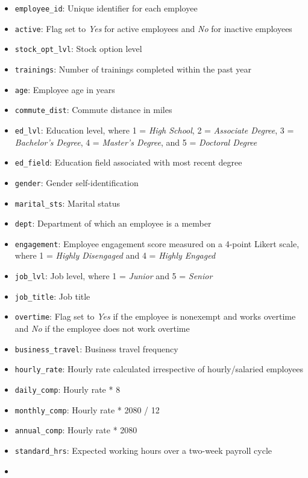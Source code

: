 \documentclass[]{book}
\providecommand{\tightlist}{%
  \setlength{\itemsep}{0pt}\setlength{\parskip}{0pt}}
\begin{document}
\begin{itemize}
\tightlist
\item
  \texttt{employee\_id}: Unique identifier for each employee
\item
  \texttt{active}: Flag set to \emph{Yes} for active employees and \emph{No} for inactive employees
\item
  \texttt{stock\_opt\_lvl}: Stock option level
\item
  \texttt{trainings}: Number of trainings completed within the past year
\item
  \texttt{age}: Employee age in years
\item
  \texttt{commute\_dist}: Commute distance in miles
\item
  \texttt{ed\_lvl}: Education level, where 1 = \emph{High School}, 2 = \emph{Associate Degree}, 3 = \emph{Bachelor's Degree}, 4 = \emph{Master's Degree}, and 5 = \emph{Doctoral Degree}
\item
  \texttt{ed\_field}: Education field associated with most recent degree
\item
  \texttt{gender}: Gender self-identification
\item
  \texttt{marital\_sts}: Marital status
\item
  \texttt{dept}: Department of which an employee is a member
\item
  \texttt{engagement}: Employee engagement score measured on a 4-point Likert scale, where 1 = \emph{Highly Disengaged} and 4 = \emph{Highly Engaged}
\item
  \texttt{job\_lvl}: Job level, where 1 = \emph{Junior} and 5 = \emph{Senior}
\item
  \texttt{job\_title}: Job title
\item
  \texttt{overtime}: Flag set to \emph{Yes} if the employee is nonexempt and works overtime and \emph{No} if the employee does not work overtime
\item
  \texttt{business\_travel}: Business travel frequency
\item
  \texttt{hourly\_rate}: Hourly rate calculated irrespective of hourly/salaried employees
\item
  \texttt{daily\_comp}: Hourly rate * 8
\item
  \texttt{monthly\_comp}: Hourly rate * 2080 / 12
\item
  \texttt{annual\_comp}: Hourly rate * 2080
\item
  \texttt{standard\_hrs}: Expected working hours over a two-week payroll cycle
\item

\end{itemize}
\end{document}
